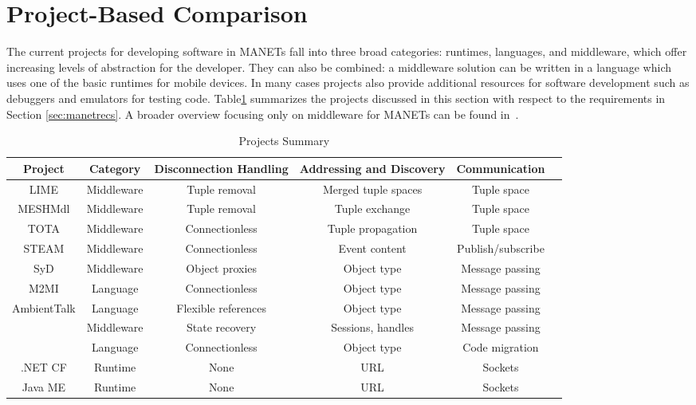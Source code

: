 \section{Project-Based Comparison}\label{sec:proj_eval}

The current projects for developing software in MANETs fall into three broad categories: runtimes, languages, and middleware, which offer increasing levels of abstraction for the developer. They can also be combined: a middleware solution can be written in a language which uses one of the basic runtimes for mobile devices. In many cases projects also provide additional resources for software development such as debuggers and emulators for testing code. Table\ref{table:projs} summarizes the projects discussed in this section with respect to the requirements in Section \ref{sec:manetrecs}. A broader overview focusing only on middleware for MANETs can be found in~\cite{middlewaresurvey}.

\begin{table}
\centering
\caption{Projects Summary}
\begin{tabular}{|c|c|c|c|c|c|} \hline
Project & Category & Disconnection Handling & Addressing and Discovery & Communication \\ \hline
LIME & Middleware & Tuple removal & Merged tuple spaces & Tuple space \\ \hline
MESHMdl & Middleware & Tuple removal & Tuple exchange & Tuple space \\ \hline
TOTA & Middleware & Connectionless & Tuple propagation & Tuple space \\ \hline
STEAM & Middleware  & Connectionless & Event content & Publish/subscribe \\ \hline
SyD & Middleware &  Object proxies &  Object type & Message passing \\ \hline
M2MI & Language & Connectionless &  Object type & Message passing \\ \hline
AmbientTalk & Language &  Flexible references &  Object type & Message passing \\ \hline

SpatialViews & Language & Connectionless & Object type & Code migration \\ \hline
.NET CF & Runtime &  None & URL & Sockets \\ \hline
Java ME & Runtime & None & URL & Sockets \\ \hline
\end{tabular}
\label{table:projs}
\end{table}

